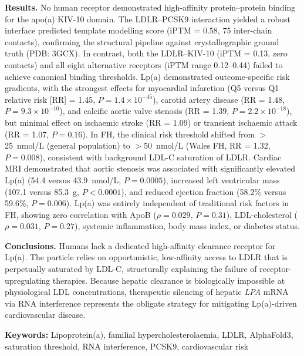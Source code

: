 \documentclass[11pt,a4paper]{article}
\newcommand{\lpa}{Lp(a)}
\newcommand{\pcsk}{PCSK9}
\newcommand{\iptm}{iPTM}
\newcommand{\kiv}{KIV-10}
\newcommand{\fh}{FH}
\begin{document}
\textbf{Results.}
No human receptor demonstrated high-affinity protein--protein binding for the apo(a) \kiv{} domain. The LDLR--\pcsk{} interaction yielded a robust interface predicted template modelling score (\iptm{} = 0.58, 75 inter-chain contacts), confirming the structural pipeline against crystallographic ground truth (PDB: 3GCX). In contrast, both the LDLR--\kiv{} (\iptm{} = 0.13, zero contacts) and all eight alternative receptors (\iptm{} range 0.12--0.44) failed to achieve canonical binding thresholds. \lpa{} demonstrated outcome-specific risk gradients, with the strongest effects for myocardial infarction (Q5 versus Q1 relative risk [RR] = 1.45, $P = 1.4 \times 10^{-45}$), carotid artery disease (RR = 1.48, $P = 9.3 \times 10^{-10}$), and calcific aortic valve stenosis (RR = 1.39, $P = 2.2 \times 10^{-18}$), but minimal effect on ischaemic stroke (RR = 1.09) or transient ischaemic attack (RR = 1.07, $P = 0.16$). In \fh{}, the clinical risk threshold shifted from $>$25~nmol/L (general population) to $>$50~nmol/L (Wales \fh{}, RR = 1.32, $P = 0.008$), consistent with background LDL-C saturation of LDLR. Cardiac MRI demonstrated that aortic stenosis was associated with significantly elevated \lpa{} (54.4 versus 43.9~nmol/L, $P = 0.0005$), increased left ventricular mass (107.1 versus 85.3~g, $P < 0.0001$), and reduced ejection fraction (58.2\% versus 59.6\%, $P = 0.006$). \lpa{} was entirely independent of traditional risk factors in \fh{}, showing zero correlation with ApoB ($\rho = 0.029$, $P = 0.31$), LDL-cholesterol ($\rho = 0.031$, $P = 0.27$), systemic inflammation, body mass index, or diabetes status.

\textbf{Conclusions.}
Humans lack a dedicated high-affinity clearance receptor for \lpa{}. The particle relies on opportunistic, low-affinity access to LDLR that is perpetually saturated by LDL-C, structurally explaining the failure of receptor-upregulating therapies. Because hepatic clearance is biologically impossible at physiological LDL concentrations, therapeutic silencing of hepatic \textit{LPA} mRNA via RNA interference represents the obligate strategy for mitigating \lpa{}-driven cardiovascular disease.

\vspace{8pt}
\textbf{Keywords:} Lipoprotein(a), familial hypercholesterolaemia, LDLR, AlphaFold3, saturation threshold, RNA interference, PCSK9, cardiovascular risk

\end{document}
